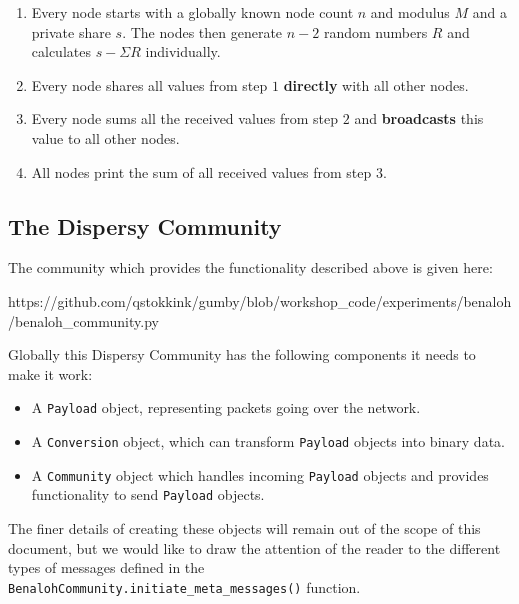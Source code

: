 \documentclass{article}
\begin{document}
\begin{enumerate}
\item Every node starts with a globally known node count $n$ and modulus $M$ and a private share $s$.
The nodes then generate $n-2$ random numbers $R$ and calculates $s - \Sigma R$ individually.
\item Every node shares all values from step $1$ \textbf{directly} with all other nodes.
\item Every node sums all the received values from step $2$ and \textbf{broadcasts} this value to all other nodes.
\item All nodes print the sum of all received values from step $3$.
\end{enumerate}

\subsection{The Dispersy Community}
\noindent The community which provides the functionality described above is given here:

https://github.com/qstokkink/gumby/blob/workshop\_code/experiments/benaloh/benaloh\_community.py

\vspace{\baselineskip}
\noindent Globally this Dispersy Community has the following components it needs to make it work:

\begin{itemize}
\item A \texttt{Payload} object, representing packets going over the network.
\item A \texttt{Conversion} object, which can transform \texttt{Payload} objects into binary data.
\item A \texttt{Community} object which handles incoming \texttt{Payload} objects and provides functionality to send \texttt{Payload} objects.
\end{itemize}

\noindent The finer details of creating these objects will remain out of the scope of this document, but we would like to draw the attention of the reader to the different types of messages defined in the \\\texttt{BenalohCommunity.initiate\_meta\_messages()} function.
\end{document}
